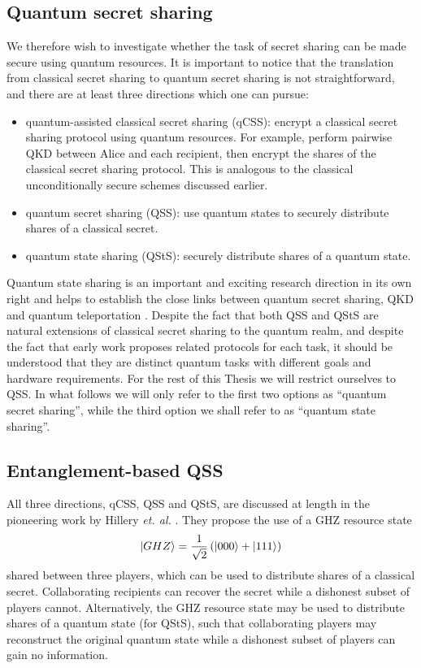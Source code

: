\subsection{Quantum secret sharing}
We therefore wish to investigate whether the task of secret sharing can be made secure using quantum resources. It is important to notice that the translation from classical secret sharing to quantum secret sharing is not straightforward, and there are at least three directions which one can pursue:

\begin{itemize}
\item quantum-assisted classical secret sharing (qCSS): encrypt a classical secret sharing protocol \cite{Shamir1979, Blakley1979} using quantum resources. For example, perform pairwise QKD between Alice and each recipient, then encrypt the shares of the classical secret sharing protocol. This is analogous to the classical unconditionally secure schemes discussed earlier.
\item quantum secret sharing (QSS): use quantum states to securely distribute shares of a classical secret.
\item quantum state sharing (QStS): securely distribute shares of a quantum state.
\end{itemize}

Quantum state sharing is an important and exciting research direction in its own right and helps to establish the close links between quantum secret sharing, QKD and quantum teleportation \cite{Braunstein1998, Hillery1999, Markham2008}. Despite the fact that both QSS and QStS are natural extensions of classical secret sharing to the quantum realm, and despite the fact that early work \cite{Hillery1999} proposes related protocols for each task, it should be understood that they are distinct quantum tasks with different goals and hardware requirements. For the rest of this Thesis we will restrict ourselves to QSS. In what follows we will only refer to the first two options as ``quantum secret sharing'', while the third option we shall refer to as ``quantum state sharing''.

\subsection{Entanglement-based QSS}


All three directions, qCSS, QSS and QStS, are discussed at length in the pioneering work by Hillery \emph{et. al.} \cite{Hillery1999}. They propose the use of a GHZ resource state
\begin{equation}
\ket{GHZ} = \frac{1}{\sqrt{2}} \left(\ket{000} + \ket{111} \right)
\end{equation}
shared between three players, which can be used to distribute shares of a classical secret. Collaborating recipients can recover the secret while a dishonest subset of players cannot. Alternatively, the GHZ resource state may be used to distribute shares of a quantum state (for QStS), such that collaborating players may reconstruct the original quantum state while a dishonest subset of players can gain no information.

